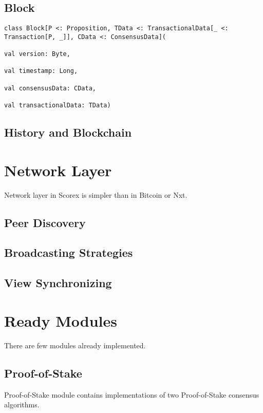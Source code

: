 \documentclass[]{report}   %
\begin{document}
\subsection{Block}

\begin{lstlisting}
class Block[P <: Proposition, TData <: TransactionalData[_ <: Transaction[P, _]], CData <: ConsensusData](
                                                                                      val version: Byte,
                                                                                      val timestamp: Long,
                                                                                      val consensusData: CData,
                                                                                      val transactionalData: TData)
\end{lstlisting}

\subsection{History and Blockchain}

\section{Network Layer}

Network layer in Scorex is simpler than in Bitcoin or Nxt. 

\subsection{Peer Discovery}

\subsection{Broadcasting Strategies}

\subsection{View Synchronizing}

\section{Ready Modules}
There are few modules already implemented.

\subsection{Proof-of-Stake}
Proof-of-Stake module contains implementations of two Proof-of-Stake consensus algorithms. 
\end{document}

